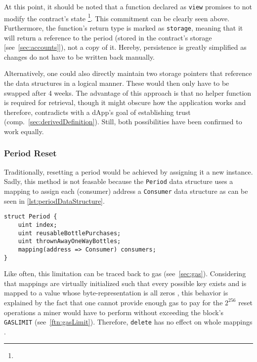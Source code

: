  At this point, it should be noted that a function declared as \texttt{view} promises to not modify the contract's state \cite[p.~82]{solidityDocs} \footnote{}. This commitment can be clearly seen above. Furthermore, the function's return type is marked as \texttt{storage}, meaning that it will return a reference to the period (stored in the contract's storage [see~\ref{sec:accounts}]), not a copy of it. Hereby, persistence is greatly simplified as changes do not have to be written back manually.
 
 Alternatively, one could also directly maintain two storage pointers that reference the data structures in a logical manner. These would then only have to be swapped after 4 weeks. The advantage of this approach is that no helper function is required for retrieval, though it might obscure how the application works and therefore, contradicts with a \ac{dApp}'s goal of establishing trust (comp.~\ref{sec:derivedDefinition}). Still, both possibilities have been confirmed to work equally.

\subsubsection{Period Reset}
Traditionally, resetting a period would be achieved by assigning it a new instance. Sadly, this method is not feasable because the \texttt{Period} data structure uses a mapping to assign each (consumer) address a \texttt{Consumer} data structure as can be seen in \autoref{lst:periodDataStructure}. 

\begin{lstlisting}[language=Solidity, caption=Period data structure, label=lst:periodDataStructure]
struct Period {
	uint index;
	uint reusableBottlePurchases;
	uint thrownAwayOneWayBottles;
	mapping(address => Consumer) consumers;
}
\end{lstlisting}

Like often, this limitation can be traced back to gas (see~\ref{sec:gas}). Considering that mappings are virtually initialized such that every possible key exists and is mapped to a value whose byte-representation is all zeros \cite[p.~62]{solidityDocs}, this behavior is explained by the fact that one cannot provide enough gas to pay for the $2^{256}$ reset operations a miner would have to perform without exceeding the block's \texttt{GASLIMIT} (see~\autoref{ftn:gasLimit}). Therefore, \texttt{delete} has no effect on whole mappings \cite[p.~63]{solidityDocs}.

